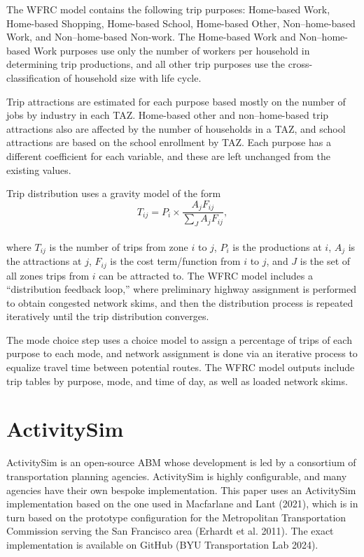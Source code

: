 \documentclass[fancy, oneside, mastersfancy, ms]{byuthesis}
\begin{document}
The WFRC model contains the following trip purposes: Home-based Work,
Home-based Shopping, Home-based School, Home-based Other,
Non--home-based Work, and Non--home-based Non-work. The Home-based Work
and Non--home-based Work purposes use only the number of workers per
household in determining trip productions, and all other trip purposes
use the cross-classification of household size with life cycle.

Trip attractions are estimated for each purpose based mostly on the
number of jobs by industry in each TAZ. Home-based other and
non--home-based trip attractions also are affected by the number of
households in a TAZ, and school attractions are based on the school
enrollment by TAZ. Each purpose has a different coefficient for each
variable, and these are left unchanged from the existing values.

Trip distribution uses a gravity model of the form\\
\[
T_{ij} = P_i \times \frac{A_j  F_{ij}}{\displaystyle \sum_J A_j  F_{ij}},
\]\\
where \(T_{ij}\) is the number of trips from zone \(i\) to \(j\),
\(P_i\) is the productions at \(i\), \(A_j\) is the attractions at
\(j\), \(F_{ij}\) is the cost term/function from \(i\) to \(j\), and
\(J\) is the set of all zones trips from \(i\) can be attracted to. The
WFRC model includes a ``distribution feedback loop,'' where preliminary
highway assignment is performed to obtain congested network skims, and
then the distribution process is repeated iteratively until the trip
distribution converges.

The mode choice step uses a choice model to assign a percentage of trips
of each purpose to each mode, and network assignment is done via an
iterative process to equalize travel time between potential routes. The
WFRC model outputs include trip tables by purpose, mode, and time of
day, as well as loaded network skims.

\section{ActivitySim}\label{sec-activitysim}

ActivitySim is an open-source ABM whose development is led by a
consortium of transportation planning agencies. ActivitySim is highly
configurable, and many agencies have their own bespoke implementation.
This paper uses an ActivitySim implementation based on the one used in
Macfarlane and Lant (2021), which is in turn based on the prototype
configuration for the Metropolitan Transportation Commission serving the
San Francisco area (Erhardt et al. 2011). The exact implementation is
available on GitHub (BYU Transportation Lab 2024).
\end{document}
